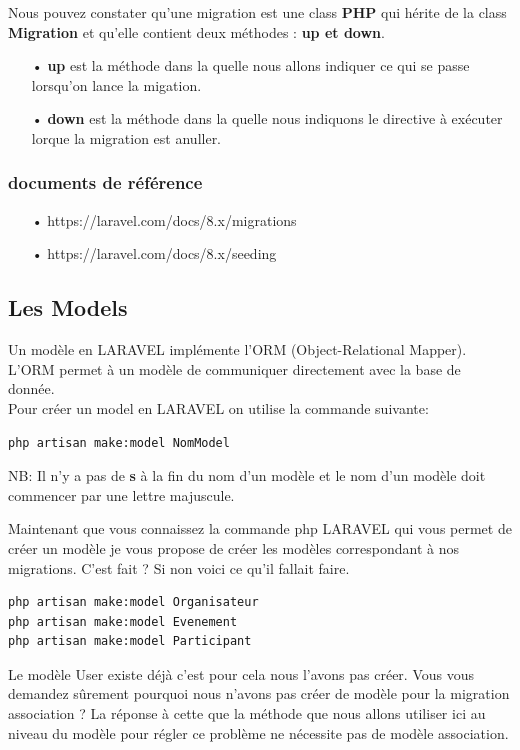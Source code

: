 \documentclass[12pt,a4paper]{article}
\begin{document}
Nous pouvez constater qu'une migration est une class \textbf{PHP} qui hérite de la class
\textbf{Migration} et qu'elle contient deux méthodes : \textbf{up et down}.

\begin{itemize}
\item[•] \textbf{up} est la méthode dans la quelle nous allons indiquer ce qui se passe lorsqu'on lance la migation.
\item[•] \textbf{down} est la méthode dans la quelle nous indiquons le directive à exécuter lorque la migration
est anuller.
\end{itemize}

\subsubsection{documents de référence}
\begin{itemize}
\item[•] https://laravel.com/docs/8.x/migrations
\item[•] https://laravel.com/docs/8.x/seeding
\end{itemize}

\subsection{Les Models}
Un modèle en LARAVEL implémente l'ORM (Object-Relational Mapper). L'ORM permet à un modèle de 
communiquer directement avec la base de donnée.\\

Pour créer un model en LARAVEL on utilise la commande suivante:
\begin{verbatim}
php artisan make:model NomModel
\end{verbatim}
NB: Il n'y a pas de \textbf{s} à la fin du nom d'un modèle et le nom d'un modèle doit commencer par 
une lettre majuscule.

Maintenant que vous connaissez la commande php LARAVEL qui vous permet de créer un modèle je vous
propose de créer les modèles correspondant à nos migrations.
C'est fait ? Si non voici ce qu'il fallait faire.
\begin{verbatim}
php artisan make:model Organisateur
php artisan make:model Evenement
php artisan make:model Participant
\end{verbatim}

Le modèle User existe déjà c'est pour cela nous l'avons pas créer.
Vous vous demandez sûrement pourquoi nous n'avons pas créer de modèle pour la migration association ?
La réponse à cette que la méthode que nous allons utiliser ici au niveau du modèle pour régler ce
problème ne nécessite pas de modèle association.
\end{document}
